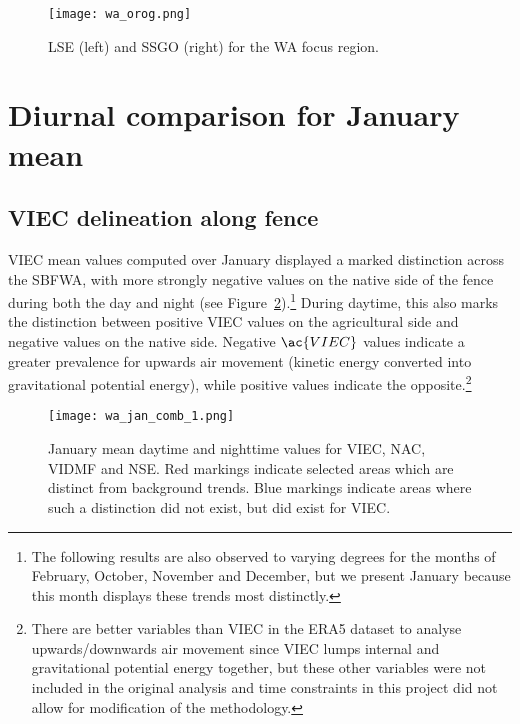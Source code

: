 \begin{figure}[!ht]
	\centering
	\texttt{[image: wa\_orog.png]}
	\caption[Orography for WA focus region]{\acf{LSE} (left) and \acf{SSGO} (right) for the \ac{WA} focus region.}
	\label{fig:wa_orog}
\end{figure}

\section{Diurnal comparison for January mean}
\label{sec:comp_diurnal}

\subsection{VIEC delineation along fence}

\ac{VIEC} mean values computed over January displayed a marked distinction across the \acf{SBFWA}, with more strongly negative values on the native side of the fence during both the day and night (see Figure~\ref{fig:wa_jan_comb_1}).\footnote{The following results are also observed to varying degrees for the months of February, October, November and December, but we present January because this month displays these trends most distinctly.} During daytime, this also marks the distinction between positive \ac{VIEC} values on the agricultural side and negative values on the native side. Negative $\ac{VIEC}$ values indicate a greater prevalence for upwards air movement (kinetic energy converted into gravitational potential energy), while positive values indicate the opposite.\footnote{There are better variables than \ac{VIEC} in the ERA5 dataset to analyse upwards/downwards air movement since \ac{VIEC} lumps internal and gravitational potential energy together, but these other variables were not included in the original analysis and time constraints in this project did not allow for modification of the methodology.}

\begin{figure}[!ht]
	\centering
	\texttt{[image: wa\_jan\_comb\_1.png]}
	\caption[January means for selected variables 1]{January mean daytime and nighttime values for \acs{VIEC}, \acs{NAC}, \acs{VIDMF} and \acs{NSE}. Red markings indicate selected areas which are distinct from background trends. Blue markings indicate areas where such a distinction did not exist, but did exist for \acs{VIEC}.}
	\label{fig:wa_jan_comb_1}
\end{figure}

